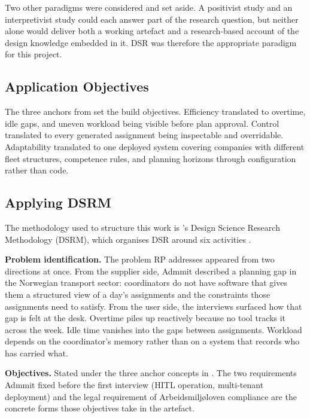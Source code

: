 Two other paradigms were considered and set aside. A positivist study and an interpretivist study could each answer part of the research question, but neither alone would deliver both a working artefact and a research-based account of the design knowledge embedded in it. DSR was therefore the appropriate paradigm for this project.

\subsection{Application Objectives}
\label{sec:application-objectives}

The three anchors from  set the build objectives. Efficiency translated to overtime, idle gaps, and uneven workload being visible before plan approval. Control translated to every generated assignment being inspectable and overridable. Adaptability translated to one deployed system covering companies with different fleet structures, competence rules, and planning horizons through configuration rather than code.

\subsection{Applying DSRM}
\label{sec:dsrm-applied}

The methodology used to structure this work is \textcite{peffers2007dsrm}'s Design Science Research Methodology (DSRM), which organises DSR around six activities \parencite[p.~46]{peffers2007dsrm}.

\textbf{Problem identification.} The problem RP addresses appeared from two directions at once. From the supplier side, Admmit described a planning gap in the Norwegian transport sector: coordinators do not have software that gives them a structured view of a day's assignments and the constraints those assignments need to satisfy. From the user side, the interviews surfaced how that gap is felt at the desk. Overtime piles up reactively because no tool tracks it across the week. Idle time vanishes into the gaps between assignments. Workload depends on the coordinator's memory rather than on a system that records who has carried what.

\textbf{Objectives.} Stated under the three anchor concepts in . The two requirements Admmit fixed before the first interview (HITL operation, multi-tenant deployment) and the legal requirement of Arbeidsmiljøloven compliance are the concrete forms those objectives take in the artefact.

